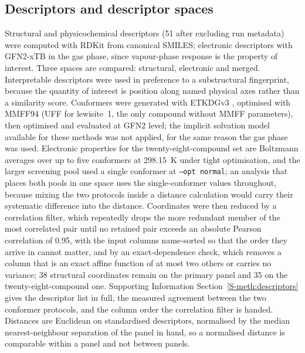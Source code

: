 \documentclass[journal=ancham,manuscript=article,margin=1in]{achemso}
\begin{document}
\subsection{Descriptors and descriptor spaces}
Structural and physicochemical descriptors (51 after excluding run metadata)
were computed with RDKit \cite{rdkit} from canonical SMILES; electronic
descriptors with GFN2-xTB \cite{bannwarth2019} in the gas phase, since
vapour-phase response is the property of interest. Three spaces are compared:
structural, electronic and merged. Interpretable descriptors were used in
preference to a substructural fingerprint, because the quantity of interest is
position along named physical axes rather than a similarity score. Conformers were
generated with ETKDGv3 \cite{wang2020,riniker2015}, optimised with MMFF94
\cite{halgren1996} (UFF \cite{rappe1992} for lewisite~1, the only compound
without MMFF parameters), then optimised and evaluated at GFN2 level; the
implicit solvation model available for these methods \cite{ehlert2021} was not
applied, for the same reason the gas phase was used. Electronic properties for
the twenty-eight-compound set are Boltzmann averages over up to five conformers
at 298.15~K under tight optimisation, and the larger screening pool used a
single conformer at \texttt{--opt normal}; an analysis that places both pools
in one space uses the single-conformer values throughout, because mixing the
two protocols inside a distance calculation would carry their systematic
difference into the distance. Coordinates were then reduced by a correlation
filter, which repeatedly drops the more redundant member of the most correlated
pair until no retained pair exceeds an absolute Pearson correlation of 0.95,
with the input columns name-sorted so that the order they arrive in cannot
matter, and by an exact-dependence check, which removes a column that is an
exact affine function of at most two others or carries no variance; 38 structural coordinates
remain on the primary panel and 35 on the twenty-eight-compound one. Supporting
Information Section~\ref{S-meth:descriptors} gives the descriptor list in full,
the measured agreement between the two conformer protocols, and the column
order the correlation filter is handed. Distances are Euclidean on
standardised descriptors, normalised by the median nearest-neighbour separation
of the panel in hand, so a normalised distance is comparable within a panel and
not between panels.
\end{document}
